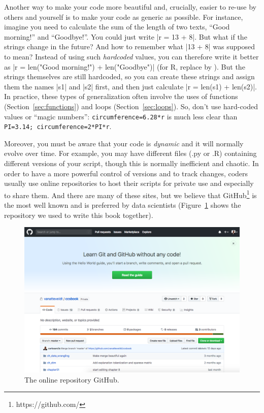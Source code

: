 Another way to make your code more beautiful and, crucially, easier to re-use by others and yourself is to make your code as generic as possible. For instance, imagine you need to calculate the sum of the length of two texts, ``Good morning!'' and ``Goodbye!''. You could just write |r = 13 + 8|. But what if the strings change in the future? And how to remember what |13 + 8| was supposed to mean? Instead of using such \emph{hardcoded} values, you can therefore write it better as |r = len("Good morning!") + len("Goodbye")| (for R, replace  by ). But the strings themselves are still hardcoded, so you can  create these strings and assign them the names |s1| and |s2| first, and then just calculate |r = len(s1) + len(s2)|. In practice, these types of generalization often involve the uses of functions (Section~\ref{sec:functions}) and loops (Section~\ref{sec:loops}). So, don't use hard-coded values or ``magic numbers'': \verb+circumference=6.28*r+ is much less clear than \verb+PI=3.14; circumference=2*PI*r+.

Moreover, you must be aware that your code is \textit{dynamic} and it will normally evolve over time. For example, you may have different files (.py or .R) containing different versions of your script, though this is normally inefficient and chaotic. In order to have a more powerful control of versions and to track changes, coders usually use online repositories to host their scripts for private use and especially to share them. And there are many of these sites, but we believe that GitHub\footnote{https://github.com/} is the most well known and is preferred by data scientists (Figure~\ref{fig:github} shows the repository we used to write this book together).

\begin{figure}
\centering
\includegraphics[width=0.9\linewidth]{figures/ch04_github}
\caption{The online repository GitHub.}
\label{fig:github}
\end{figure}

